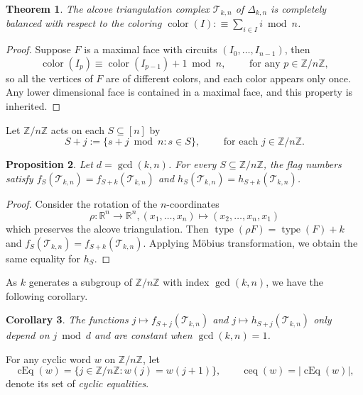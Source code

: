 \documentclass[12pt,reqno]{amsart}
\theoremstyle{plain}
\newtheorem{theorem}{Theorem}[section]
\newtheorem{proposition}[theorem]{Proposition}
\newtheorem{corollary}[theorem]{Corollary}
\theoremstyle{definition}
\newcommand{\Z}{\mathbb{Z}}
\newcommand{\R}{\mathbb{R}}
\newcommand{\hyp}{\Delta_{k,n}}
\newcommand{\Tri}{\mathcal{T}_{k,n}}
\DeclareMathOperator{\typ}{type}
\DeclareMathOperator{\cEq}{cEq}
\DeclareMathOperator{\col}{color}
\DeclareMathOperator{\ceq}{ceq}
\begin{document}
\begin{theorem}\label{thm:coloring}
	The alcove triangulation complex $ \Tri $ of $ \hyp $
	is completely balanced with respect to the coloring $
		\col(I):\equiv \sum_{i \in I} i \bmod n$.
\end{theorem}

\begin{proof}
	Suppose $F$ is a maximal face with circuits $(I_0,\dots,I_{n-1})$, then \[\col(I_{p}) \equiv \col(I_{p-1}) + 1 \bmod n, \qquad \text{ for any }p \in \Z/n\Z, \] so all the vertices of $F$ are of different colors, and each color appears only once. Any lower dimensional face is
    contained in a maximal face, and this property is inherited.
\end{proof}

Let $ \Z/n\Z $ acts on each $ S \subseteq [n] $ by
\begin{equation}
	S + j:= \{s + j \bmod n \colon s \in S\}, \qquad \text{ for each } j \in \Z/n\Z.
\end{equation}
\begin{proposition}
	Let $d = \gcd(k,n)$. For every $S \subseteq \Z/n\Z$, the flag numbers satisfy $f_S(\Tri) = f_{S+k}(\Tri)$ and $h_S(\Tri) = h_{S+k}(\Tri)$.
\end{proposition}
\begin{proof}
	Consider the rotation of the $n$-coordinates
	\[
		\rho: \R^n \to \R^n, (x_1,\dots,x_n) \mapsto
		(x_2,\dots,x_{n},x_1)
	\]
	which preserves the alcove triangulation. Then $\typ(\rho F) = \typ(F) + k$ and $f_S(\Tri) = f_{S+k}(\Tri)$.
	Applying M\"obius transformation, we obtain the same equality for $h_S$.
\end{proof}

As $k$ generates a subgroup of $\Z/n\Z$ with index $\gcd(k,n)$, we have the following corollary.
\begin{corollary}\label{cor:gcd}
	The functions $j \mapsto f_{S+j}(\Tri)$ and $j \mapsto h_{S+j}(\Tri)$ only depend on $j \bmod d$ and
	are constant when $\gcd(k,n)=1$.
\end{corollary}

For any cyclic word $w$ on $\Z/n\Z$, let
\begin{equation}
	\cEq(w)  =\{j\in\Z/n\Z:w(j)=w(j+1)\}, \qquad \ceq(w) = |\cEq(w)|,
\end{equation}
denote its set of \emph{cyclic equalities}.
\end{document}
